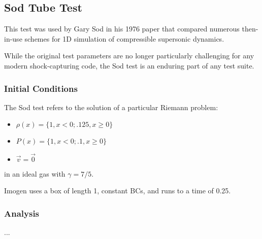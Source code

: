 
\subsection{Sod Tube Test}

This test was used by Gary Sod in his 1976 paper that compared numerous then-in-use schemes
for 1D simulation of compressible supersonic dynamics.

While the original test parameters are no longer particularly challenging for any modern 
shock-capturing code, the Sod test is an enduring part of any test suite.

\subsubsection{Initial Conditions}

The Sod test refers to the solution of a particular Riemann problem:
\begin{itemize}
\item $\rho(x) = \{ 1, x < 0; .125, x \ge 0 \}$
\item $P(x) = \{ 1, x < 0; .1, x \ge 0 \} $
\item $\vec{v} = \vec{0}$
\end{itemize}
in an ideal gas with $\gamma = 7/5$.

Imogen uses a box of length 1, constant BCs, and runs to a time of 0.25.

\subsubsection{Analysis}

...

